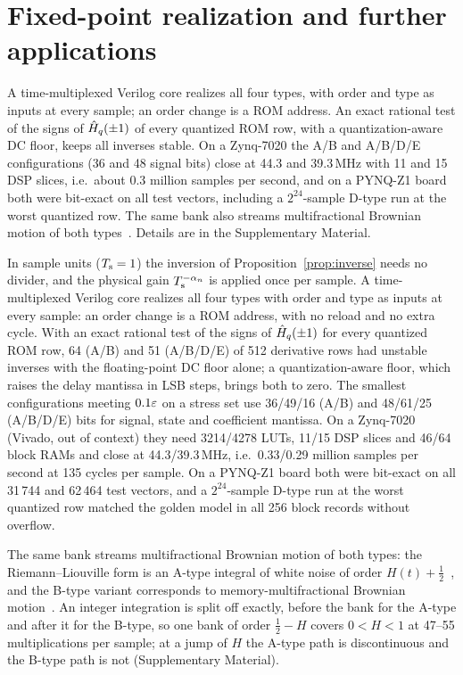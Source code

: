 \section{Fixed-point realization and further applications}\label{sec:hw}

\ifsp
A time-multiplexed Verilog core realizes all four types, with order and type as inputs at every sample; an order change is a ROM address. An exact rational test of the signs of $\hat H_q(\pm1)$ of every quantized ROM row, with a quantization-aware DC floor, keeps all inverses stable. On a Zynq-7020 the A/B and A/B/D/E configurations (36 and 48 signal bits) close at 44.3 and 39.3\,MHz with 11 and 15 DSP slices, i.e.\ about 0.3 million samples per second, and on a PYNQ-Z1 board both were bit-exact on all test vectors, including a $2^{24}$-sample D-type run at the worst quantized row. The same bank also streams multifractional Brownian motion of both types~\cite{wang2023mmfbm}. Details are in the Supplementary Material.

\else
In sample units ($T_{\mathrm{s}}=1$) the inversion of Proposition~\ref{prop:inverse} needs no divider, and the physical gain $T_{\mathrm{s}}^{-\alpha_n}$ is applied once per sample. A time-multiplexed Verilog core realizes all four types with order and type as inputs at every sample: an order change is a ROM address, with no reload and no extra cycle. With an exact rational test of the signs of $\hat H_q(\pm1)$ for every quantized ROM row, 64 (A/B) and 51 (A/B/D/E) of 512 derivative rows had unstable inverses with the floating-point DC floor alone; a quantization-aware floor, which raises the delay mantissa in LSB steps, brings both to zero. The smallest configurations meeting $0.1\varepsilon$ on a stress set use 36/49/16 (A/B) and 48/61/25 (A/B/D/E) bits for signal, state and coefficient mantissa. On a Zynq-7020 (Vivado, out of context) they need 3214/4278 LUTs, 11/15 DSP slices and 46/64 block RAMs and close at 44.3/39.3\,MHz, i.e.\ 0.33/0.29 million samples per second at 135 cycles per sample. On a PYNQ-Z1 board both were bit-exact on all 31\,744 and 62\,464 test vectors, and a $2^{24}$-sample D-type run at the worst quantized row matched the golden model in all 256 block records without overflow.

The same bank streams multifractional Brownian motion of both types: the Riemann--Liouville form is an A-type integral of white noise of order $H(t)+\tfrac12$~\cite{lim2001,muniandy2001}, and the B-type variant corresponds to memory-multifractional Brownian motion~\cite{wang2023mmfbm}. An integer integration is split off exactly, before the bank for the A-type and after it for the B-type, so one bank of order $\tfrac12-H$ covers $0<H<1$ at 47--55 multiplications per sample; at a jump of $H$ the A-type path is discontinuous and the B-type path is not (Supplementary Material).
\fi

